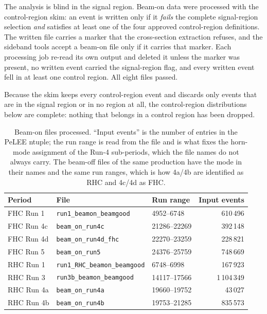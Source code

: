 \documentclass[11pt,a4paper]{article}
\begin{document}
The analysis is blind in the signal region. Beam-on data were processed with the
control-region skim: an event is written only if it \emph{fails} the complete
signal-region selection \emph{and} satisfies at least one of the four approved
control-region definitions. The written file carries a marker that the cross-section
extraction refuses, and the sideband tools accept a beam-on file only if it carries that
marker. Each processing job re-read its own output and deleted it unless the marker was
present, no written event carried the signal-region flag, and every written event fell in
at least one control region. All eight files passed.

Because the skim keeps every control-region event and discards only events that are in the
signal region or in no region at all, the control-region distributions below are complete:
nothing that belongs in a control region has been dropped.

\begin{table}[H]
  \centering
  \caption{Beam-on files processed. ``Input events'' is the number of entries in the
    PeLEE ntuple; the run range is read from the file and is what fixes the horn-mode
    assignment of the Run-4 sub-periods, which the file names do not always carry. The
    beam-off files of the same production have the mode in their names and the same run
    ranges, which is how 4a/4b are identified as RHC and 4c/4d as FHC.}
  \label{tab:files}
  \small
  \begin{tabular}{lllr}
    \toprule
    Period & File & Run range & Input events \\
    \midrule
    FHC Run 1  & \texttt{run1\_beamon\_beamgood}        & 4952--6748   & 610\,496 \\
    FHC Run 4c & \texttt{beam\_on\_run4c}               & 21286--22269 & 392\,148 \\
    FHC Run 4d & \texttt{beam\_on\_run4d\_fhc}          & 22270--23259 & 228\,821 \\
    FHC Run 5  & \texttt{beam\_on\_run5}                & 24376--25759 & 748\,669 \\
    \midrule
    RHC Run 1  & \texttt{run1\_RHC\_beamon\_beamgood}   & 6748--6998   & 167\,923 \\
    RHC Run 3  & \texttt{run3b\_beamon\_beamgood}       & 14117--17566 & 1\,104\,349 \\
    RHC Run 4a & \texttt{beam\_on\_run4a}               & 19660--19752 & 43\,027 \\
    RHC Run 4b & \texttt{beam\_on\_run4b}               & 19753--21285 & 835\,573 \\
    \bottomrule
  \end{tabular}
\end{table}
\end{document}
